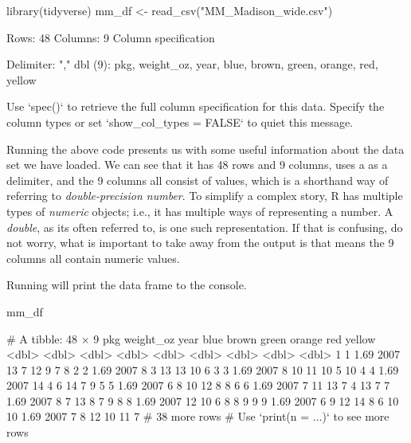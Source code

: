 \begin{inR}
library(tidyverse)
mm_df <- read_csv("MM_Madison_wide.csv")
\end{inR}

\begin{outR}
Rows: 48 Columns: 9                                                                                                      
Column specification 

Delimiter: ","
dbl (9): pkg, weight_oz, year, blue, brown, green, orange, red, yellow

Use `spec()` to retrieve the full column specification for this data.
Specify the column types or set `show_col_types = FALSE` to quiet this message.
\end{outR}

Running the above code presents us with some useful information about the data set we have loaded.  We can see that it has 48 rows and 9 columns, uses a \R{,} as a delimiter, and the 9 columns all consist of  values, which is a shorthand way of referring to \textit{double-precision number}. To simplify a complex story, R has multiple types of \textit{numeric} objects; i.e., it has multiple ways of representing a number. A \textit{double}, as its often referred to, is one such representation. If that is confusing, do not worry, what is important to take away from the output is that  means the 9 columns all contain numeric values.

Running  will print the data frame to the console.

\begin{inR}
mm_df
\end{inR}

\begin{outR}
# A tibble: 48 × 9
     pkg weight_oz  year  blue brown green orange   red yellow
   <dbl>     <dbl> <dbl> <dbl> <dbl> <dbl>  <dbl> <dbl>  <dbl>
 1     1      1.69  2007    13     7    12      9     7      8
 2     2      1.69  2007     8     3    13     13    10      6
 3     3      1.69  2007     8    10    11     10     5     10
 4     4      1.69  2007    14     4     6     14     7      9
 5     5      1.69  2007     6     8    10     12     8      8
 6     6      1.69  2007     7    11    13      7     4     13
 7     7      1.69  2007     8     7    13      8     7      9
 8     8      1.69  2007    12    10     6      8     8      9
 9     9      1.69  2007     6     9    12     14     8      6
10    10      1.69  2007     7     8    12     10    11      7
# 38 more rows
# Use `print(n = ...)` to see more rows
\end{outR}

